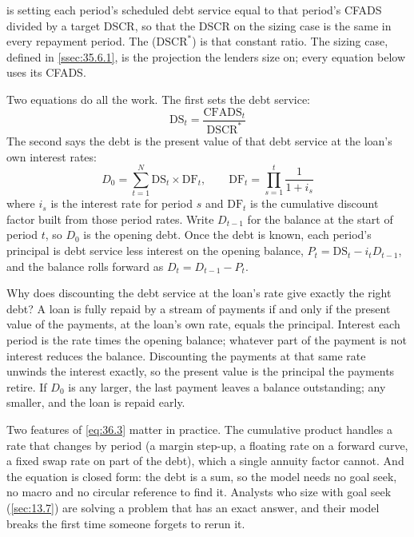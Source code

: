 is setting each period's scheduled debt service equal to that period's CFADS divided by a target DSCR, so that the DSCR on the sizing case is the same in every repayment period. The  ($\mathrm{DSCR}^{*}$) is that constant ratio. The sizing case, defined in \cref{ssec:35.6.1}, is the projection the lenders size on; every equation below uses its CFADS.

Two equations do all the work. The first sets the debt service:
\begin{equation}\label{eq:36.2}
\mathrm{DS}_t = \frac{\mathrm{CFADS}_t}{\mathrm{DSCR}^{*}}
\end{equation}
The second says the debt is the present value of that debt service at the loan's own interest rates:
\begin{equation}\label{eq:36.3}
D_0 = \sum_{t=1}^{N} \mathrm{DS}_t \times \mathrm{DF}_t, \qquad \mathrm{DF}_t = \prod_{s=1}^{t} \frac{1}{1+i_s}
\end{equation}
where $i_s$ is the interest rate for period $s$ and $\mathrm{DF}_t$ is the cumulative discount factor built from those period rates. Write $D_{t-1}$ for the balance at the start of period $t$, so $D_0$ is the opening debt. Once the debt is known, each period's principal is debt service less interest on the opening balance, $P_t = \mathrm{DS}_t - i_t D_{t-1}$, and the balance rolls forward as $D_t = D_{t-1} - P_t$.

Why does discounting the debt service at the loan's rate give exactly the right debt? A loan is fully repaid by a stream of payments if and only if the present value of the payments, at the loan's own rate, equals the principal. Interest each period is the rate times the opening balance; whatever part of the payment is not interest reduces the balance. Discounting the payments at that same rate unwinds the interest exactly, so the present value is the principal the payments retire. If $D_0$ is any larger, the last payment leaves a balance outstanding; any smaller, and the loan is repaid early.

Two features of \cref{eq:36.3} matter in practice. The cumulative product handles a rate that changes by period (a margin step-up, a floating rate on a forward curve, a fixed swap rate on part of the debt), which a single annuity factor cannot. And the equation is closed form: the debt is a sum, so the model needs no goal seek, no macro and no circular reference to find it. Analysts who size with goal seek (\cref{sec:13.7}) are solving a problem that has an exact answer, and their model breaks the first time someone forgets to rerun it.

